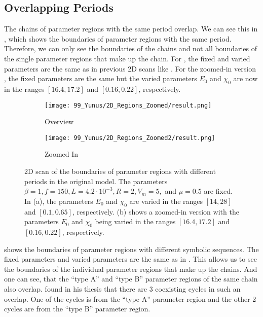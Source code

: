 \subsection{Overlapping Periods}

The chains of parameter regions with the same period overlap.
We can see this in , which shows the boundaries of parameter regions with the same period.
Therefore, we can only see the boundaries of the chains and not all boundaries of the single parameter regions that make up the chain.
For , the fixed and varied parameters are the same as in previous 2D scans like .
For the zoomed-in version , the fixed parameters are the same but the varied parameters $E_0$ and $\chi_0$ are now in the ranges $[16.4, 17.2]$ and $[0.16, 0.22]$, respectively.

\begin{figure}
	\centering
	\begin{subfigure}{0.4\textwidth}
		\texttt{[image: 99\_Yunus/2D\_Regions\_Zoomed/result.png]}
		\caption{Overview}
		\label{fig:state.og.overlapping.chains.full}
	\end{subfigure}
	\begin{subfigure}{0.4\textwidth}
		\texttt{[image: 99\_Yunus/2D\_Regions\_Zoomed2/result.png]}
		\caption{Zoomed In}
		\label{fig:state.og.overlapping.chains.zoomed}
	\end{subfigure}
	\caption[2D scan of the boundaries of parameter regions with different periods in the original model]{
		2D scan of the boundaries of parameter regions with different periods in the original model.
		The parameters $\beta = 1, f = 150, L = 4.2 \cdot 10^{-3}, R = 2, V_m = 5,$ and $\mu = 0.5$ are fixed.
		In (a), the parameters $E_0$ and $\chi_0$ are varied in the ranges $[14, 28]$ and $[0.1, 0.65]$, respectively.
		(b) shows a zoomed-in version with the parameters $E_0$ and $\chi_0$ being varied in the ranges $[16.4, 17.2]$ and $[0.16, 0.22]$, respectively.
	}
	\label{fig:state.og.overlapping.chains}
\end{figure}

 shows the boundaries of parameter regions with different symbolic sequences.
The fixed parameters and varied parameters are the same as in .
This allows us to see the boundaries of the individual parameter regions that make up the chains.
And one can see, that the ``type A'' and ``type B'' parameter regions of the same chain also overlap.
 found in his thesis that there are 3 coexisting cycles in such an overlap.
One of the cycles is from the ``type A'' parameter region and the other 2 cycles are from the ``type B'' parameter region.

